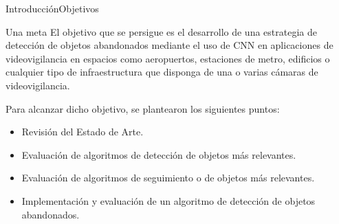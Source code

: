 \begin{frame}{Introducción}{Objetivos}

\begin{exampleblock}{Una meta}
\justifying
El objetivo que se persigue es el desarrollo de una estrategia de detección de objetos abandonados mediante el uso de CNN en aplicaciones de videovigilancia en espacios como aeropuertos, estaciones de metro, edificios o cualquier tipo de infraestructura que disponga de una o varias cámaras de videovigilancia.
\end{exampleblock}

\vspace{0.3cm}
Para alcanzar dicho objetivo, se plantearon los siguientes puntos:
\vspace{0.1cm}

\begin{itemize}
    \justifying
    \item Revisión del Estado de Arte.
    \item Evaluación de algoritmos de detección de objetos más relevantes.
    \item Evaluación de algoritmos de seguimiento o de objetos más relevantes.
    \item Implementación y evaluación de un algoritmo de detección de objetos abandonados.
\end{itemize}
  
\end{frame}